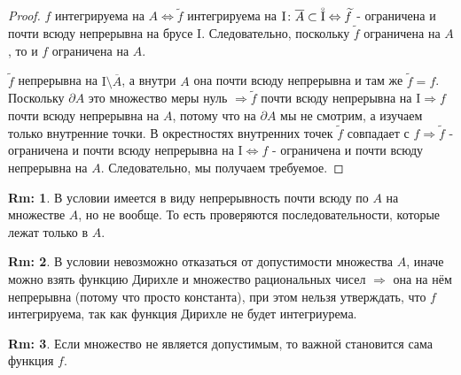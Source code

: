 \documentclass[12pt]{article}
\newcommand{\MI}{\mathrm{I}}
\theoremstyle{definition}
\newtheorem{rem}{Rm:}
\newcommand{\wte}[1]{\widetilde{#1}}
\newcommand{\ovl}[1]{\overline{#1}}
\newcommand{\Circ}[1]{\accentset{\circ}{#1}}
\begin{document}
\begin{proof}
	$f$ интегрируема на $A \Leftrightarrow \wte{f}$ интегрируема на $\MI \colon \ovl{A} \subset \Circ{\MI} \Leftrightarrow \wte{f}$ - ограничена и почти всюду непрерывна на брусе $\MI$. Следовательно, поскольку $\wte{f}$ ограничена на $A$, то и $f$ ограничена на $A$. 
	
	$\wte{f}$ непрерывна на $\MI \setminus \ovl{A}$, а внутри $A$ она почти всюду непрерывна и там же $\wte{f} = f$. Поскольку $\partial A$ это множество меры нуль $\Rightarrow \wte{f}$ почти всюду непрерывна на $\MI \Rightarrow f$ почти всюду непрерывна на $A$, потому что на $\partial A$ мы не смотрим, а изучаем только внутренние точки. В окрестностях внутренних точек $\wte{f}$ совпадает с $f \Rightarrow \wte{f}$ - ограничена и почти всюду непрерывна на $\MI \Leftrightarrow {f}$ - ограничена и почти всюду непрерывна на $A$. Следовательно, мы получаем требуемое.
\end{proof}
\begin{rem}
	В условии имеется в виду непрерывность почти всюду по $A$ на множестве $A$, но не вообще. То есть проверяются последовательности, которые лежат только в $A$.
\end{rem}
\begin{rem}
	В условии невозможно отказаться от допустимости множества $A$, иначе можно взять функцию Дирихле и множество рациональных чисел $\Rightarrow$ она на нём непрерывна (потому что просто константа), при этом нельзя утверждать, что $f$ интегрируема, так как функция Дирихле не будет интегриурема.
\end{rem}
\begin{rem}
	Если множество не является допустимым, то важной становится сама функция $f$.
\end{rem}
\end{document}
